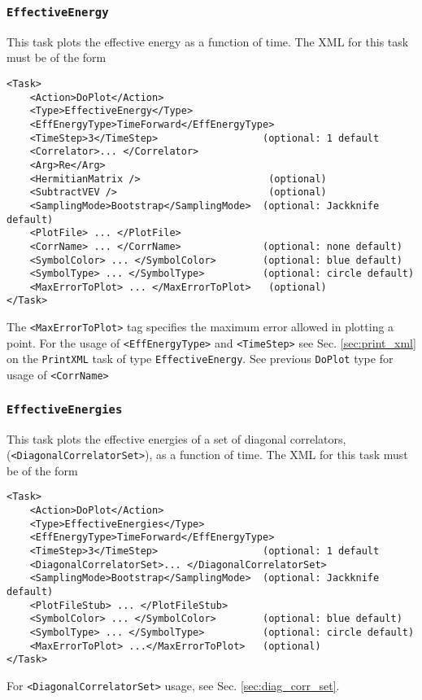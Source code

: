 \documentclass[12pt]{article}
\newcommand{\vb}{\texttt}
\begin{document}
\subsubsection{\vb{EffectiveEnergy}}
This task plots the effective energy as a function of time. The XML for this task must be of the form
\begin{verbatim}
<Task>
    <Action>DoPlot</Action>
    <Type>EffectiveEnergy</Type>
    <EffEnergyType>TimeForward</EffEnergyType>
    <TimeStep>3</TimeStep>                  (optional: 1 default
    <Correlator>... </Correlator>
    <Arg>Re</Arg>
    <HermitianMatrix />                      (optional)
    <SubtractVEV />                          (optional)
    <SamplingMode>Bootstrap</SamplingMode>  (optional: Jackknife default)
    <PlotFile> ... </PlotFile>
    <CorrName> ... </CorrName>              (optional: none default)
    <SymbolColor> ... </SymbolColor>        (optional: blue default)
    <SymbolType> ... </SymbolType>          (optional: circle default)
    <MaxErrorToPlot> ... </MaxErrorToPlot>   (optional)
</Task>
\end{verbatim}
The \vb{<MaxErrorToPlot>} tag specifies the maximum error allowed in plotting a point.
For the usage of \vb{<EffEnergyType>} and \vb{<TimeStep>} see Sec. \ref{sec:print_xml}
on the \vb{PrintXML} task of type \vb{EffectiveEnergy}.
See previous \vb{DoPlot} type for usage of \vb{<CorrName>}

\subsubsection{\vb{EffectiveEnergies}}
This task plots the effective energies of a set of diagonal correlators, (\vb{<DiagonalCorrelatorSet>}),
as a function of time. The XML for this task must be of the form
\begin{verbatim}
<Task>
    <Action>DoPlot</Action>
    <Type>EffectiveEnergies</Type>
    <EffEnergyType>TimeForward</EffEnergyType>
    <TimeStep>3</TimeStep>                  (optional: 1 default
    <DiagonalCorrelatorSet>... </DiagonalCorrelatorSet>
    <SamplingMode>Bootstrap</SamplingMode>  (optional: Jackknife default)
    <PlotFileStub> ... </PlotFileStub>
    <SymbolColor> ... </SymbolColor>        (optional: blue default)
    <SymbolType> ... </SymbolType>          (optional: circle default)
    <MaxErrorToPlot> ...</MaxErrorToPlot>   (optional)
</Task>
\end{verbatim}
For \vb{<DiagonalCorrelatorSet>} usage, see Sec. \ref{sec:diag_corr_set}.
\end{document}
